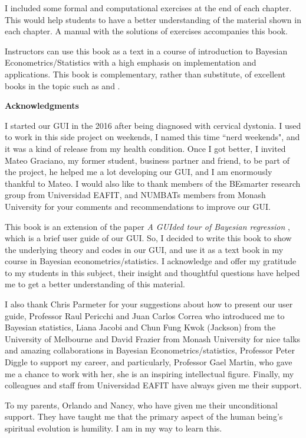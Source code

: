 I included some formal and computational exercises at the end of each chapter. This would help students to have a better understanding of the material shown in each chapter. A manual with the solutions of exercises accompanies this book.

Instructors can use this book as a text in a course of introduction to Bayesian Econometrics/Statistics with a high emphasis on implementation and applications. This book is complementary, rather than substitute, of excellent books in the topic such as \cite{gelman2021bayesian,rossi2012bayesian,greenberg2012introduction, geweke2005contemporary, lancaster2004introduction} and \cite{koop2003bayesian}.

\textbf{Acknowledgments}

I started our GUI in the 2016 after being diagnosed with cervical dystonia. I used to work in this side project on weekends, I named this time ``nerd weekends", and it was a kind of release from my health condition. Once I got better, I invited Mateo Graciano, my former student, business partner and friend, to be part of the project, he helped me a lot developing our GUI, and I am enormously thankful to Mateo. I would also like to thank members of the BEsmarter research group from Universidad EAFIT, and NUMBATs members from Monash University for your comments and recommendations to improve our GUI.

This book is an extension of the paper \textit{A GUIded tour of Bayesian regression} \cite{Ramirez2020}, which is a brief user guide of our GUI. So, I decided to write this book to show the underlying theory and codes in our GUI, and use it as a text book in my course in Bayesian econometrics/statistics. I acknowledge and offer my gratitude to my students in this subject, their insight and thoughtful questions have helped me to get a better understanding of this material.   

I also thank Chris Parmeter for your suggestions about how to present our user guide, Professor Raul Pericchi and Juan Carlos Correa who introduced me to Bayesian statistics, Liana Jacobi and Chun Fung Kwok (Jackson) from the University of Melbourne and David Frazier from Monash University for nice talks and amazing collaborations in Bayesian Econometrics/statistics, Professor Peter Diggle to support my career, and particularly, Professor Gael Martin, who gave me a chance to work with her, she is an inspiring intellectual figure. Finally, my colleagues and staff from Universidad EAFIT have always given me their support.

To my parents, Orlando and Nancy, who have given me their unconditional support. They have taught me that the primary aspect of the human being's spiritual evolution is humility. I am in my way to learn this.


